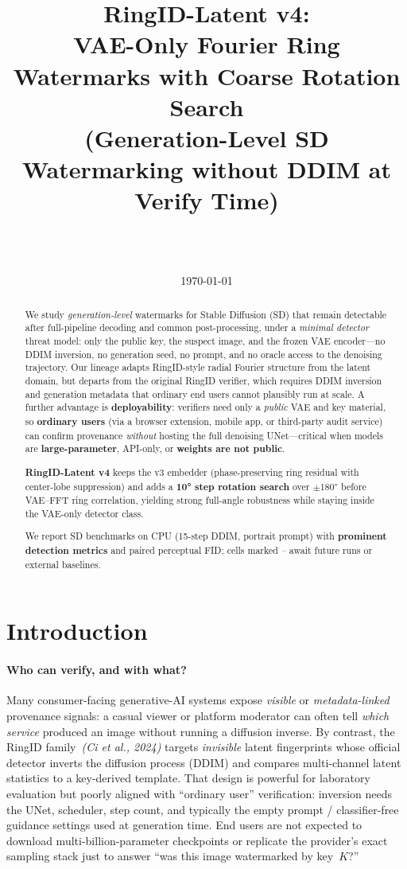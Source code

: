 \documentclass[11pt,a4paper]{article}
\title{%
  \textbf{RingID-Latent v4:}\\[4pt]
  VAE-Only Fourier Ring Watermarks with Coarse Rotation Search\\[6pt]
  \large (Generation-Level SD Watermarking without DDIM at Verify Time)
}
\author{%
  \placeholder{Author names}\\
  \placeholder{Affiliation}\\
  \texttt{\placeholder{email}}
}
\date{\today}
\newcommand{\placeholder}[1]{\textcolor{gray!70!black}{\textit{#1}}}
\newcommand{\metricgood}[1]{\textbf{\textcolor{green!40!black}{#1}}}
\begin{document}
\maketitle

\begin{abstract}
We study \emph{generation-level} watermarks for Stable Diffusion (SD) that remain detectable after full-pipeline decoding and common post-processing, under a \emph{minimal detector} threat model: only the public key, the suspect image, and the frozen VAE encoder---no DDIM inversion, no generation seed, no prompt, and no oracle access to the denoising trajectory.
Our lineage adapts RingID-style radial Fourier structure from the latent domain, but departs from the original RingID verifier, which requires DDIM inversion and generation metadata that ordinary end users cannot plausibly run at scale.
A further advantage is \textbf{deployability}: verifiers need only a \emph{public} VAE and key material, so \textbf{ordinary users} (via a browser extension, mobile app, or third-party audit service) can confirm provenance \emph{without} hosting the full denoising UNet---critical when models are \textbf{large-parameter}, API-only, or \textbf{weights are not public}.

\textbf{RingID-Latent v4} keeps the v3 embedder (phase-preserving ring residual with center-lobe suppression) and adds a \textbf{10° step rotation search} over $\pm180°$ before VAE--FFT ring correlation, yielding strong full-angle robustness while staying inside the VAE-only detector class.

We report SD benchmarks on CPU (15-step DDIM, portrait prompt) with \metricgood{prominent detection metrics} and paired perceptual FID; cells marked \placeholder{--} await future runs or external baselines.
\end{abstract}

\section{Introduction}

\paragraph{Who can verify, and with what?}
Many consumer-facing generative-AI systems expose \emph{visible} or \emph{metadata-linked} provenance signals: a casual viewer or platform moderator can often tell \emph{which service} produced an image without running a diffusion inverse.
By contrast, the RingID family~\placeholder{(Ci et al., 2024)} targets \emph{invisible} latent fingerprints whose official detector inverts the diffusion process (DDIM) and compares multi-channel latent statistics to a key-derived template.
That design is powerful for laboratory evaluation but poorly aligned with ``ordinary user'' verification: inversion needs the UNet, scheduler, step count, and typically the empty prompt / classifier-free guidance settings used at generation time.
End users are not expected to download multi-billion-parameter checkpoints or replicate the provider's exact sampling stack just to answer ``was this image watermarked by key~$K$?''
\end{document}
